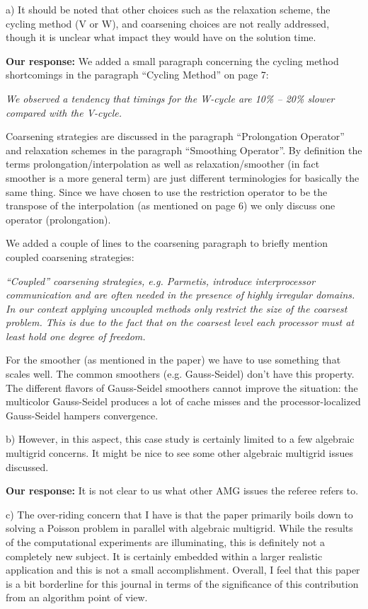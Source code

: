 \documentclass[10pt,pdftex]{report}
\begin{document}
a) It should be noted that other choices such as the relaxation scheme, the
cycling method (V or W), and coarsening choices are not really addressed, though
it is unclear what impact they would have on the solution time. 

{\textbf{Our response:}} We added a small paragraph concerning the cycling
method shortcomings in the paragraph ``Cycling Method'' on page 7: 

\textit{We observed a tendency that timings for the W-cycle are 10\% -- 20\% slower
compared with the V-cycle.}
 
Coarsening strategies are discussed in the paragraph ``Prolongation Operator''
and relaxation schemes in the paragraph ``Smoothing Operator''. By
definition the terms prolongation/interpolation as well as
relaxation/smoother (in fact smoother is a more general term) are just
different terminologies for basically the same thing.  Since we have chosen
to use the restriction operator to  be the transpose of the interpolation
(as mentioned on page 6) we only discuss one operator (prolongation).

We added a couple of lines to the coarsening paragraph to briefly mention
coupled coarsening strategies:

\textit{``Coupled'' coarsening strategies, e.g. Parmetis, introduce
interprocessor communication and are often needed in the presence of highly
irregular domains.  In our context applying uncoupled methods only restrict
the size of the coarsest problem.  This is due to the fact that on the
coarsest level each processor must at least hold one degree of freedom.}

For the smoother (as mentioned in the paper) we have to use something that
scales well. The common smoothers (e.g. Gauss-Seidel) don't have
this property. The different flavors of Gauss-Seidel smoothers cannot
improve the situation: the multicolor Gauss-Seidel produces a lot of cache
misses and the processor-localized Gauss-Seidel hampers convergence.

b) However, in this aspect, this case study is certainly limited to a few
algebraic multigrid concerns. It might be nice to see some other algebraic
multigrid issues discussed.

{\textbf{Our response:}} It is not clear to us what other AMG issues the
referee refers to.

c) The over-riding concern that I have is that the paper primarily boils down to
solving a Poisson problem in parallel with algebraic multigrid.  While the
results of the computational experiments are illuminating, this is definitely not
a completely new subject. It is certainly embedded within a larger realistic
application and this is not a small accomplishment.  Overall, I feel that this
paper is a bit borderline for this journal in terms of the significance of this
contribution from an algorithm point of view.  
\end{document}
